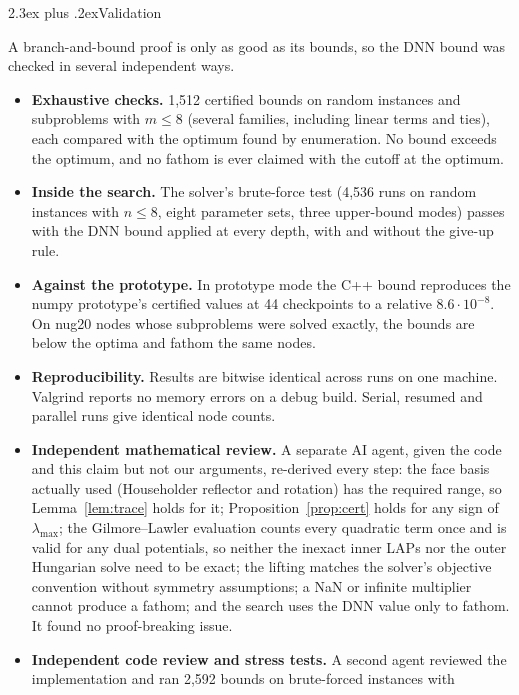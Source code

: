 \documentclass[10pt]{article}
\makeatletter
\renewcommand\section{\@startsection{section}{1}{\z@}{-3.5ex plus -1ex minus -.2ex}%
  {2.3ex plus .2ex}{\normalfont\normalsize\bfseries}}
\theoremstyle{remark}
\newcommand{\lmax}{\lambda_{\max}}
\makeatother
\begin{document}
\appendix
\section{Validation}\label{sec:validation}

A branch-and-bound proof is only as good as its bounds, so the DNN bound was
checked in several independent ways.
\begin{itemize}
\item \textbf{Exhaustive checks.} 1,512 certified bounds on random instances and
  subproblems with $m\le8$ (several families, including linear terms and ties),
  each compared with the optimum found by enumeration. No bound exceeds the
  optimum, and no fathom is ever claimed with the cutoff at the optimum.
\item \textbf{Inside the search.} The solver's brute-force test (4,536 runs on
  random instances with $n\le 8$, eight parameter sets, three upper-bound modes)
  passes with the DNN bound applied at every depth, with and without the give-up
  rule.
\item \textbf{Against the prototype.} In prototype mode the C++ bound reproduces the
  numpy prototype's certified values at 44 checkpoints to a relative $8.6\cdot10^{-8}$.
  On nug20 nodes whose subproblems were solved exactly, the bounds are below the
  optima and fathom the same nodes.
\item \textbf{Reproducibility.} Results are bitwise identical across runs on one
  machine. Valgrind reports no memory errors on a debug build. Serial, resumed and
  parallel runs give identical node counts.
\item \textbf{Independent mathematical review.} A separate AI agent, given the code
  and this claim but not our arguments, re-derived every step: the face basis
  actually used (Householder reflector and rotation) has the required range, so
  Lemma~\ref{lem:trace} holds for it; Proposition~\ref{prop:cert} holds for any
  sign of $\lmax$; the Gilmore--Lawler evaluation counts every quadratic term
  once and is valid for any dual potentials, so neither the inexact inner LAPs
  nor the outer Hungarian solve need to be exact; the lifting matches the
  solver's objective convention without symmetry assumptions; a NaN or infinite
  multiplier cannot produce a fathom; and the search uses the DNN value only to
  fathom. It found no proof-breaking issue.
\item \textbf{Independent code review and stress tests.} A second agent reviewed
  the implementation and ran 2,592 bounds on brute-forced instances with

\end{itemize}
\end{document}
